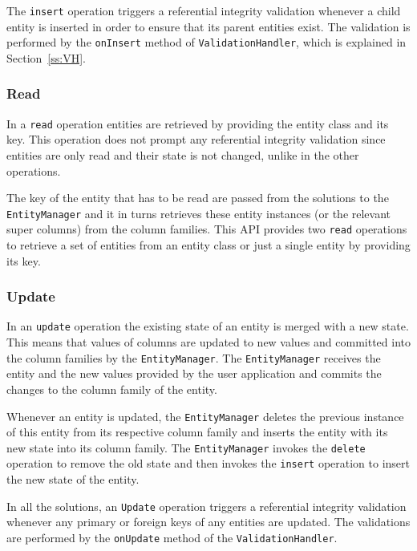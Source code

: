 		 The \texttt{insert} operation triggers a referential integrity
		validation whenever a child entity is  inserted in order to ensure that its
		parent entities exist. The validation is performed by the \texttt{onInsert}
		method of \texttt{ValidationHandler}, which is explained in
		Section~\ref{ss:VH}.
	
		\subsubsection{Read}
		In a \texttt{read} operation  entities are  retrieved by providing the
		entity class and its key. This operation does not prompt any referential integrity
		validation since entities are only read and their state is not changed, 
		 unlike in the other operations. 

		The key of the entity  that has to be read are passed from the
		solutions to the \texttt{EntityManager} and it in turns retrieves these entity
		instances (or the relevant super columns) from the column families.  This
		\ac{API} provides two \texttt{read} operations to retrieve a set of
		entities from an entity class or just a single entity by providing its key.
		
		
		\subsubsection{Update}\label{ss:update}
		In an \texttt{update} operation the existing state of an entity is merged
		with a new state. 
		This means that  values of columns are updated to new values and
		 committed into the column families by the \texttt{EntityManager}.  The
		\texttt{EntityManager} receives the entity and the new values provided by the user
		application and commits the changes to the column family of the entity. 
		
		Whenever an entity is updated, the \texttt{EntityManager} deletes the
		previous instance of this entity from its respective column family and inserts
		the entity with its new state into its column family.
		The \texttt{EntityManager} invokes  the \texttt{delete} operation to remove
		the old state and then invokes the \texttt{insert} operation to insert the new
		state of the entity.
		
		In all the solutions,  an \texttt{Update} operation triggers a referential
		integrity validation whenever any primary or foreign keys of any entities are updated.
		The validations are performed by the \texttt{onUpdate} method of the
		\texttt{ValidationHandler}.
		
